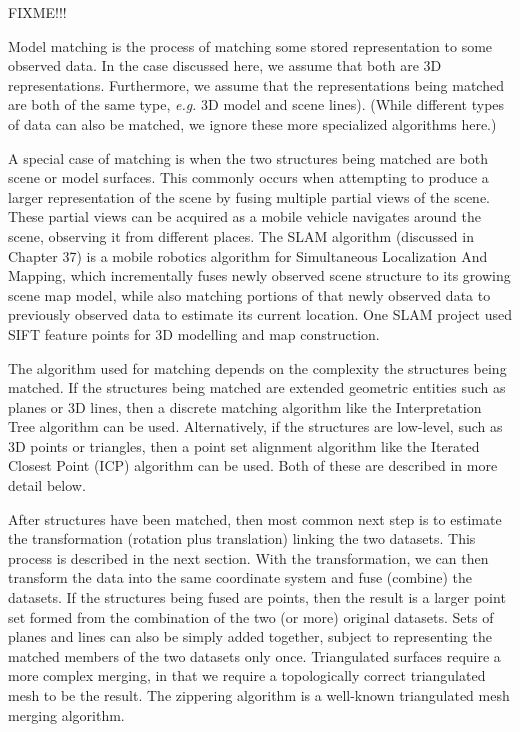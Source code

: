 \documentclass[twocolumn,oneside]{book}
\begin{document}
FIXME!!!

Model matching is the process of matching some stored representation
to some observed data. In the case discussed here, we assume that
both are 3D representations.
Furthermore, we assume that the representations being matched are both of
the same type, {\it e.g.} 3D model and scene lines).
(While different types of data can also be matched, we ignore these
more specialized algorithms here.)

A special case of matching is when the two structures being matched are
both scene or model surfaces.
This commonly occurs when attempting to produce a larger 
representation of the scene by fusing multiple partial views of the scene.
These partial views can be acquired as a mobile vehicle navigates
around the scene, observing it from different places.
The SLAM algorithm \cite{thrun} (discussed in Chapter 37) is a 
mobile robotics algorithm for Simultaneous Localization And Mapping,
which incrementally fuses newly observed scene structure to its
growing scene map model, while also matching portions of that newly observed
data to previously observed data to estimate its current location.
One SLAM project \cite{little} used SIFT feature points for 3D modelling and map construction.

The algorithm used for matching depends on the complexity
the structures being matched.
If the structures being matched are extended geometric entities such as
planes or 3D lines, then a discrete matching algorithm like the
Interpretation Tree algorithm \cite{grimson} can be used.
Alternatively, if the structures are low-level, such as 3D points 
or triangles, then a point set alignment algorithm like the 
 Iterated Closest Point (ICP) algorithm \cite{besl2} can be used.
Both of these are described in more detail below.

After structures have been matched, then most common next step is
to estimate the transformation (rotation plus translation) linking the
two datasets. This process is described in the next section.
With the transformation, we can then transform the data into the
same coordinate system and fuse (combine) the datasets.
If the structures being fused are points, then the result is a
larger point set formed from the combination of the two (or more) 
original datasets.
Sets of planes and lines can also be simply added together, subject to
representing the matched members of the two datasets only once.
Triangulated surfaces require a more complex merging, in that we require
a topologically correct triangulated mesh to be the result.
The zippering algorithm \cite{turk} is a well-known triangulated 
mesh merging algorithm.
\end{document}
